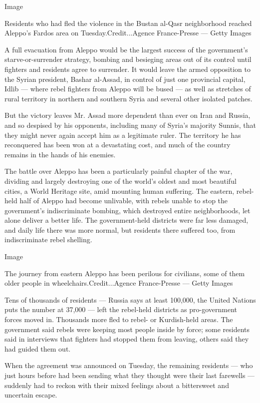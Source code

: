 Image

Residents who had fled the violence in the Bustan al-Qasr neighborhood
reached Aleppo's Fardos area on Tuesday.Credit...Agence France-Presse
--- Getty Images

A full evacuation from Aleppo would be the largest success of the
government's starve-or-surrender strategy, bombing and besieging areas
out of its control until fighters and residents agree to surrender. It
would leave the armed opposition to the Syrian president, Bashar
al-Assad, in control of just one provincial capital, Idlib --- where
rebel fighters from Aleppo will be bused --- as well as stretches of
rural territory in northern and southern Syria and several other
isolated patches.

But the victory leaves Mr. Assad more dependent than ever on Iran and
Russia, and so despised by his opponents, including many of Syria's
majority Sunnis, that they might never again accept him as a legitimate
ruler. The territory he has reconquered has been won at a devastating
cost, and much of the country remains in the hands of his enemies.

The battle over Aleppo has been a particularly painful chapter of the
war, dividing and largely destroying one of the world's oldest and most
beautiful cities, a World Heritage site, amid mounting human suffering.
The eastern, rebel-held half of Aleppo had become unlivable, with rebels
unable to stop the government's indiscriminate bombing, which destroyed
entire neighborhoods, let alone deliver a better life. The
government-held districts were far less damaged, and daily life there
was more normal, but residents there suffered too, from indiscriminate
rebel shelling.

Image

The journey from eastern Aleppo has been perilous for civilians, some of
them older people in wheelchairs.Credit...Agence France-Presse --- Getty
Images

Tens of thousands of residents --- Russia says at least 100,000, the
United Nations puts the number at 37,000 --- left the rebel-held
districts as pro-government forces moved in. Thousands more fled to
rebel- or Kurdish-held areas. The government said rebels were keeping
most people inside by force; some residents said in interviews that
fighters had stopped them from leaving, others said they had guided them
out.

When the agreement was announced on Tuesday, the remaining residents ---
who just hours before had been sending what they thought were their last
farewells --- suddenly had to reckon with their mixed feelings about a
bittersweet and uncertain escape.


